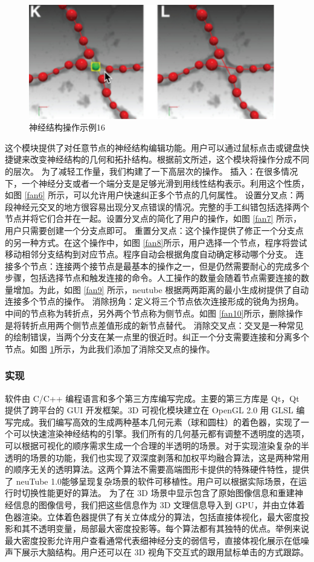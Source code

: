 {\begin{figure}
\centering
\includegraphics[width=108mm]{images/t11}
\caption{神经结构操作示例16}
\label{fan11}
\end{figure}

这个模块提供了对任意节点的神经结构编辑功能。用户可以通过鼠标点击或键盘快捷键来改变神经结构的几何和拓扑结构。根据前文所述，这个模块将操作分成不同的层次。
为了减轻工作量，我们构建了一下高层次的操作。
插入：在很多情况下，一个神经分支或者一个端分支是足够光滑到用线性结构表示。利用这个性质，如图 \ref{fan6} 所示，可以允许用户快速纠正多个节点的几何属性。
设置分叉点：两段神经元交叉的地方很容易出现分叉点错误的情况。完整的手工纠错包括选择两个节点并将它们合并在一起。设置分叉点的简化了用户的操作，如图 \ref{fan7} 所示，用户只需要创建一个分支点即可。
重置分叉点：这个操作提供了修正一个分支点的另一种方式。在这个操作中，如图 \ref{fan8}所示，用户选择一个节点，程序将尝试移动相邻分支结构到对应节点。程序自动会根据角度自动确定移动哪个分支。
连接多个节点：连接两个接节点是最基本的操作之一，但是仍然需要耐心的完成多个步骤，包括选择节点和触发连接的命令。人工操作的数量会随着节点需要连接的数量增加。为此，如图 \ref{fan9} 所示，neutube 根据两两距离的最小生成树提供了自动连接多个节点的操作。
消除拐角：定义将三个节点依次连接形成的锐角为拐角。中间的节点称为转折点，另外两个节点称为侧节点。如图 \ref{fan10}所示，删除操作是将转折点用两个侧节点差值形成的新节点替代。
消除交叉点：交叉是一种常见的绘制错误，当两个分支在某一点里的很近时。纠正一个分支需要连接和分离多个节点。如图 \ref{fan11}所示，为此我们添加了消除交叉点的操作。

\subsubsection{实现}
软件由 C/C++ 编程语言和多个第三方库编写完成。主要的第三方库是 Qt，Qt 提供了跨平台的 GUI 开发框架。3D 可视化模块建立在 OpenGL 2.0 用 GLSL 编写完成。我们编写高效的生成两种基本几何元素（球和圆柱）的着色器，实现了一个可以快速渲染神经结构的引擎。我们所有的几何基元都有调整不透明度的选项，可以根据可视化的顺序需求生成一个合理的半透明的场景。对于实现渲染复杂的半透明的场景的功能，我们也实现了双深度剥落和加权平均融合算法，这是两种常用的顺序无关的透明算法。这两个算法不需要高端图形卡提供的特殊硬件特性，提供了 neuTube 1.0能够呈现复杂场景的软件可移植性。用户可以根据实际场景，在运行时切换性能更好的算法。
为了在 3D 场景中显示包含了原始图像信息和重建神经信息的图像信号，我们把这些信息作为 3D 文理信息导入到 GPU，并由立体着色器渲染。立体着色器提供了有关立体成分的算法，包括直接体视化，最大密度投影和其不透明变量，局部最大密度投影等。每个算法都有其独特的优点。举例来说最大密度投影允许用户查看通常代表细神经分支的弱信号，直接体视化展示在低噪声下展示大脑结构。用户还可以在 3D 视角下交互式的跟用鼠标单击的方式跟踪。

}
